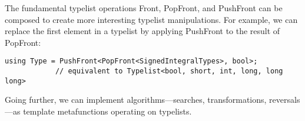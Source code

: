 
The fundamental typelist operations Front, PopFront, and PushFront can be composed to create more interesting typelist manipulations. For example, we can replace the first element in a typelist by applying PushFront to the result of PopFront:

\begin{lstlisting}[style=styleCXX]
using Type = PushFront<PopFront<SignedIntegralTypes>, bool>;
			// equivalent to Typelist<bool, short, int, long, long long>
\end{lstlisting}

Going further, we can implement algorithms—searches, transformations, reversals—as template metafunctions operating on typelists.








